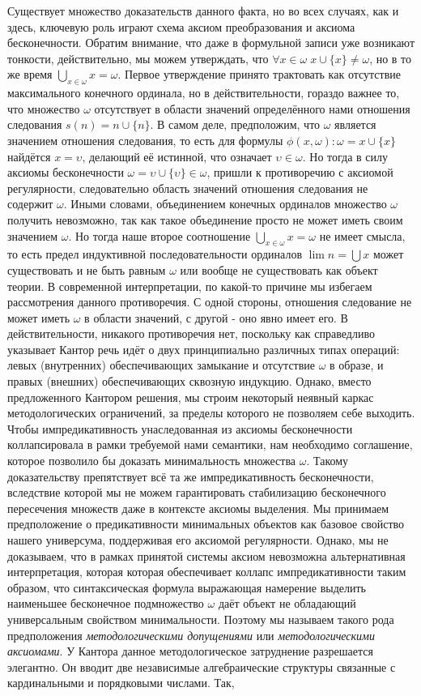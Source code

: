 \documentclass[12pt]{article}
\begin{document}
Существует множество доказательств данного факта, но во всех случаях, как и здесь, ключевую роль играют схема аксиом преобразования и аксиома бесконечности. Обратим внимание, что даже в формульной записи уже возникают тонкости, действительно, мы можем утверждать, что $\forall x \in \omega \; x \cup \{ x \} \neq \omega$, но в то же время $\bigcup\limits_{ x \in \omega } x = \omega$. Первое утверждение принято трактовать как отсутствие максимального конечного ординала, но в действительности, гораздо важнее то, что множество $\omega$ отсутствует в области значений определённого нами отношения следования $s(n) = n \cup \{ n \}$. В самом деле, предположим, что $\omega$ является значением отношения следования, то есть для формулы $\phi(x, \omega): \omega = x \cup \{ x \}$ найдётся $x = \upsilon$, делающий её истинной, что означает $\upsilon \in \omega$. Но тогда в силу аксиомы бесконечности $\omega = \upsilon \cup \{ \upsilon \} \in \omega$, пришли к противоречию с аксиомой регулярности, следовательно область значений отношения следования не содержит $\omega$. Иными словами, объединением конечных ординалов множество $\omega$ получить невозможно, так как такое объединение просто не может иметь своим значением $\omega$. Но тогда наше второе соотношение $\bigcup\limits_{ x \in \omega } x = \omega$ не имеет смысла, то есть предел индуктивной последовательности ординалов $\lim n = \bigcup x$ может существовать и не быть равным $\omega$ или вообще не существовать как объект теории. В современной интерпретации, по какой-то причине мы избегаем рассмотрения данного противоречия. С одной стороны, отношения следование не может иметь $\omega$ в области значений, с другой - оно явно имеет его. В действительности, никакого противоречия нет, поскольку как справедливо указывает Кантор речь идёт о двух принципиально различных типах операций: левых (внутренних) обеспечивающих замыкание и отсутствие $\omega$ в образе, и правых (внешних) обеспечивающих сквозную индукцию. Однако, вместо предложенного Кантором решения, мы строим некоторый неявный каркас методологических ограничений, за пределы которого не позволяем себе выходить. Чтобы импредикативность унаследованная из аксиомы бесконечности коллапсировала в рамки требуемой нами семантики, нам необходимо соглашение, которое позволило бы доказать минимальность множества $\omega$. Такому доказательству препятствует всё та же импредикативность бесконечности, вследствие которой мы не можем гарантировать стабилизацию бесконечного пересечения множеств даже в контексте аксиомы выделения. Мы принимаем предположение о предикативности минимальных объектов как базовое свойство нашего универсума, поддерживая его аксиомой регулярности. Однако, мы не доказываем, что в рамках принятой системы аксиом невозможна альтернативная интерпретация, которая которая обеспечивает коллапс импредикативности таким образом, что синтаксическая формула выражающая намерение выделить наименьшее бесконечное подмножество $\omega$ даёт объект не обладающий универсальным свойством минимальности. Поэтому мы называем такого рода предположения {\it методологическими допущениями} или {\it методологическими аксиомами}. У Кантора данное методологическое затруднение разрешается элегантно. Он вводит две независимые алгебраические структуры связанные с кардинальными и порядковыми числами. Так, 
\end{document}
